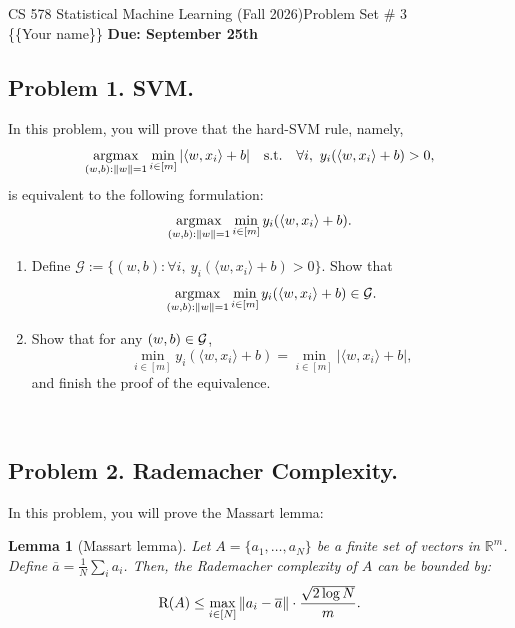 \documentclass[12pt]{article}
\newtheorem{lemma}{Lemma}
\theoremstyle{plain}
\theoremstyle{definition}
\begin{document}
\noindent CS 578 Statistical Machine Learning (Fall 2026)\hfill Problem Set \# 3\\
\{\{Your name\}\} \hfill \textbf{Due: September 25th}

\noindent\hrulefill

\subsection*{Problem 1. SVM.}
In this problem, you will prove that the hard-SVM rule, namely,
$$
\operatornamewithlimits{argmax}_{(w,b):\|w\|=1} \min_{i\in [m]} |\langle w, x_i\rangle + b|\quad \text{s.t.}\quad \forall i,~y_i(\langle w, x_i\rangle + b)>0,
$$
is equivalent to the following formulation:
$$
\operatornamewithlimits{argmax}_{(w,b):\|w\|=1} \min_{i\in [m]} y_i(\langle w, x_i\rangle + b).
$$
\begin{enumerate}
    \item Define $\mathcal{G}:=\{(w,b):\forall i,~y_i(\langle w,x_i\rangle + b)>0\}.$ Show that 
    $$
        \operatornamewithlimits{argmax}_{(w,b):\|w\|=1} \min_{i\in [m]} y_i(\langle w, x_i\rangle + b)\in \mathcal{G}.
    $$
    \item Show that for any $(w,b)\in {\cal G}$,
    $$
        \min_{i\in [m]} y_i(\langle w,x_i\rangle + b)=\min_{i\in [m]} |\langle w,x_i\rangle + b|,
    $$
    and finish the proof of the equivalence.
\end{enumerate}
\newline 
\   %
\newpage

\subsection*{Problem 2. Rademacher Complexity.}
In this problem, you will prove the Massart lemma:
\begin{lemma}[Massart lemma]
Let  $A = \{a_1,\dots, a_N\}$ be a finite set of vectors in $\mathbb{R}^m$. Define $\overline{a}=\frac{1}{N}\sum_i a_i$. Then, the Rademacher complexity of $A$ can be bounded by:
\begin{align*}
    {\rm R}(A)\leq \max_{i\in [N]} \|a_i-\overline{a}\|\cdot \frac{\sqrt{2\log N}}{m}.
\end{align*}
\end{lemma}
\end{document}
